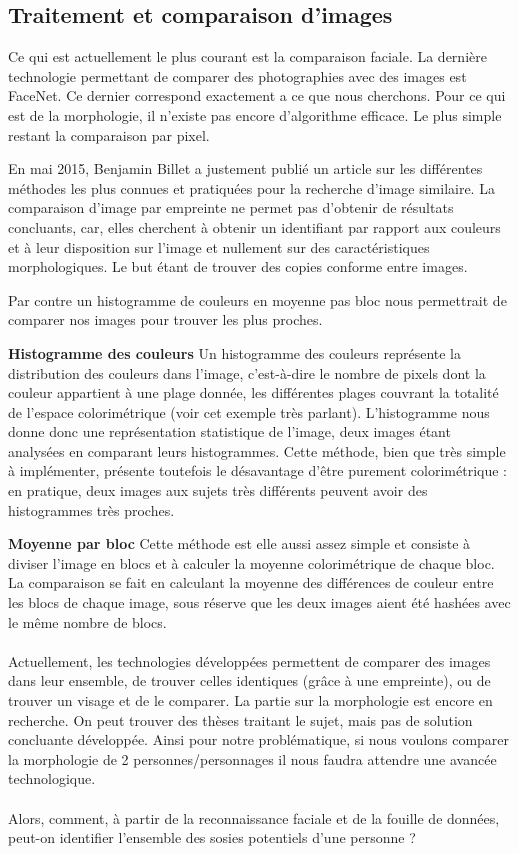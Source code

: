 \documentclass[a4paper,12pt]{article}
\begin{document}
\subsection{Traitement et comparaison d'images}
Ce qui est actuellement le plus courant est la comparaison faciale. La dernière technologie permettant de comparer des photographies avec des images est FaceNet. Ce dernier correspond exactement a ce que nous cherchons. 
Pour ce qui est de la morphologie, il n'existe pas encore d'algorithme efficace. Le plus simple restant la comparaison par pixel. 

En mai 2015, Benjamin Billet a justement publié un article sur les différentes méthodes les plus connues et pratiquées pour la recherche d'image similaire. La comparaison d'image par empreinte ne permet pas d'obtenir de résultats concluants, car, elles cherchent à obtenir un identifiant par rapport aux couleurs et à leur disposition sur l'image et nullement sur des caractéristiques morphologiques. Le but étant de trouver des copies conforme entre images. 

Par contre un histogramme de couleurs en moyenne pas bloc nous permettrait de comparer nos images pour trouver les plus proches. 

\textbf{Histogramme des couleurs}
Un histogramme des couleurs représente la distribution des couleurs dans l'image, c'est-à-dire le nombre de pixels dont la couleur appartient à une plage donnée, les différentes plages couvrant la totalité de l'espace colorimétrique (voir cet exemple très parlant). L'histogramme nous donne donc une représentation statistique de l'image, deux images étant analysées en comparant leurs histogrammes. Cette méthode, bien que très simple à implémenter, présente toutefois le désavantage d'être purement colorimétrique : en pratique, deux images aux sujets très différents peuvent avoir des histogrammes très proches.

\textbf{Moyenne par bloc}
Cette méthode est elle aussi assez simple et consiste à diviser l'image en blocs et à calculer la moyenne colorimétrique de chaque bloc. La comparaison se fait en calculant la moyenne des différences de couleur entre les blocs de chaque image, sous réserve que les deux images aient été hashées avec le même nombre de blocs. 
\\\\
Actuellement, les technologies développées permettent de comparer des images dans leur ensemble, de trouver celles identiques (grâce à une empreinte), ou de trouver un visage et de le comparer. La partie sur la morphologie est encore en recherche. On peut trouver des thèses traitant le sujet, mais pas de solution concluante développée. Ainsi pour notre problématique, si nous voulons comparer la morphologie de 2 personnes/personnages il nous faudra attendre une avancée technologique. 
\\\\
Alors, comment, à partir de la reconnaissance faciale et de la fouille de données, peut-on identifier l’ensemble des sosies potentiels d’une personne ?
\end{document}
